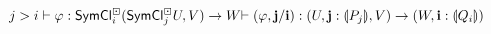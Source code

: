 \documentclass[a4paper]{article}
\begin{document}
\begin{figure}
\[{			\qquad
			j > i
			\\
			\vdash \varphi : \mathsf{SymCl}^\boxdot_i(\mathsf{SymCl}^\boxdot_j U, V) \to W
		}{
			\vdash (\varphi, \mathbf{j} / \mathbf{i}) : (U, \mathbf{j} : {\llparenthesis P_j \rrparenthesis}, V) \to (W, \mathbf{i} : {\llparenthesis Q_i \rrparenthesis})
		}{}
	\]

\end{figure}
\end{document}
